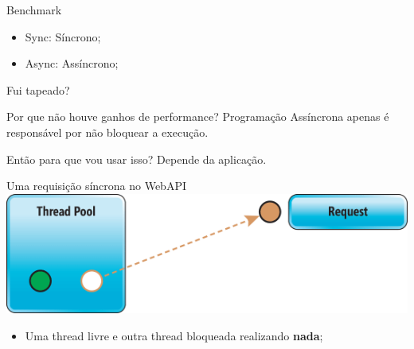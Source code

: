 \documentclass[10pt]{beamer}
\begin{document}
\begin{frame}{Benchmark}
	\begin{figure}
	\end{figure}
	\vspace{-0.5cm}
	\scriptsize
	\begin{itemize}
		\item Sync: Síncrono;
		\item Async: Assíncrono;
	\end{itemize}
\end{frame}

\begin{frame}{Fui tapeado?}
	\begin{alertblock}{Por que não houve ganhos de performance?}
		Programação Assíncrona apenas é responsável por não bloquear a execução.
	\end{alertblock}
	\vspace{0.2cm}
	\begin{exampleblock}{Então para que vou usar isso?}
		Depende da aplicação.
	\end{exampleblock}
\end{frame}

\begin{frame}{Uma requisição síncrona no WebAPI}
	\includegraphics[width=\textwidth]{imgs/sync1}
	\vspace{0.5cm}
	
	\begin{itemize}
		\item Uma thread livre e outra thread bloqueada realizando \textbf{nada};
	\end{itemize}
\end{frame}
\end{document}
